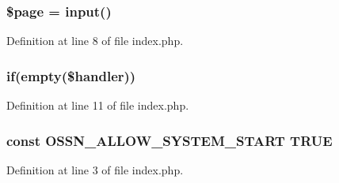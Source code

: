 \subsubsection[{\texorpdfstring{\$page}{$page}}]{\setlength{\rightskip}{0pt plus 5cm}\$page = {\bf input}(\textquotesingle{})}\hypertarget{index_8php_a0a44e6760141442bb439b1ab1395d8ff}{}\label{index_8php_a0a44e6760141442bb439b1ab1395d8ff}


Definition at line 8 of file index.\+php.

\subsubsection[{\texorpdfstring{if}{if}}]{\setlength{\rightskip}{0pt plus 5cm}if(empty(\$handler))}\hypertarget{index_8php_a6805d5faa240e2f48a9243c6c6b71a9e}{}\label{index_8php_a6805d5faa240e2f48a9243c6c6b71a9e}


Definition at line 11 of file index.\+php.

\subsubsection[{\texorpdfstring{O\+S\+S\+N\+\_\+\+A\+L\+L\+O\+W\+\_\+\+S\+Y\+S\+T\+E\+M\+\_\+\+S\+T\+A\+RT}{OSSN_ALLOW_SYSTEM_START}}]{\setlength{\rightskip}{0pt plus 5cm}const O\+S\+S\+N\+\_\+\+A\+L\+L\+O\+W\+\_\+\+S\+Y\+S\+T\+E\+M\+\_\+\+S\+T\+A\+RT T\+R\+UE}\hypertarget{index_8php_a73aeae1243c8451cb328ddfe84637175}{}\label{index_8php_a73aeae1243c8451cb328ddfe84637175}


Definition at line 3 of file index.\+php.

